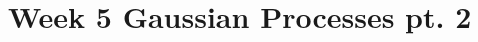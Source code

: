 \newpage
\section{Week 5 Gaussian Processes pt. 2}
\label{sec:week5:code:exercise}
\inputminted{Python}{../src/week5_gp.py}
